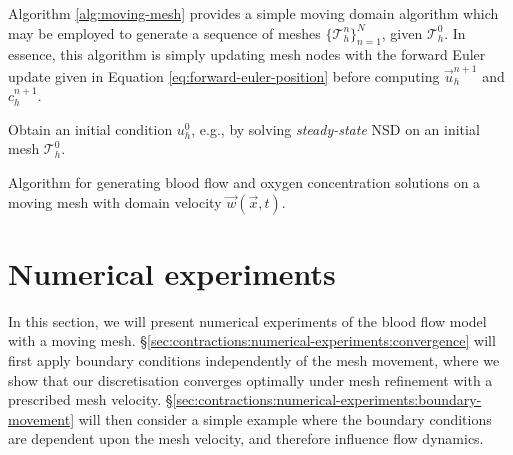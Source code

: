             Algorithm \ref{alg:moving-mesh} provides a simple moving domain algorithm which may be employed to generate a sequence of meshes $\{ \mathcal{T}^n_h \}^N_{n=1}$, given $\mathcal{T}^0_h$. In essence, this algorithm is simply updating mesh nodes with the forward Euler update given in Equation \eqref{eq:forward-euler-position} before computing $\vec{u}^{n+1}_h$ and $c^{n+1}_h$.
    
            \begin{algorithm}
                Obtain an initial condition $u^0_h$, e.g., by solving \textit{steady-state} NSD on an initial mesh $\mathcal{T}^0_h$. \\
                \caption{Algorithm for generating blood flow and oxygen concentration solutions on a moving mesh with domain velocity $\vec{w}(\vec{x}, t)$.}
                \label{alg:moving-mesh}
            \end{algorithm}

    \section{Numerical experiments} \label{sec:contractions:numerical-experiments}
        In this section, we will present numerical experiments of the blood flow model with a moving mesh. \S\ref{sec:contractions:numerical-experiments:convergence} will first apply boundary conditions independently of the mesh movement, where we show that our discretisation converges optimally under mesh refinement with a prescribed mesh velocity. \S\ref{sec:contractions:numerical-experiments:boundary-movement} will then consider a simple example where the boundary conditions are dependent upon the mesh velocity, and therefore influence flow dynamics. 

